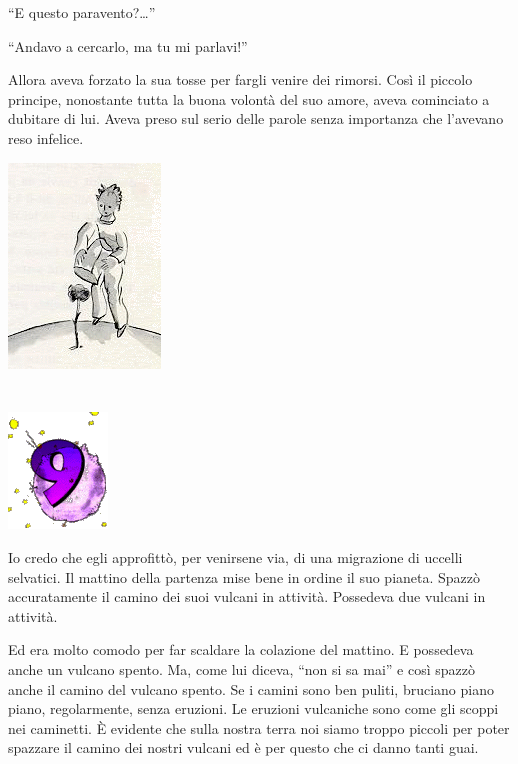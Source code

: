 \documentclass[11pt]{scrbook}
\begin{document}
``E questo paravento?\ldots{}''

``Andavo a cercarlo, ma tu mi parlavi!''

Allora aveva forzato la sua tosse per fargli venire dei rimorsi. Così il piccolo principe, nonostante tutta la buona volontà del suo amore, aveva cominciato a dubitare di lui. Aveva preso sul serio delle parole senza importanza che l'avevano reso infelice.

\begin{center}
\includegraphics{img/princKvetina}
\end{center}

\chapter{}
\begin{center}
\includegraphics{img/chapter9}
\end{center}

Io credo che egli approfittò, per venirsene via, di una migrazione di uccelli selvatici. Il mattino della partenza mise bene in ordine il suo pianeta. Spazzò accuratamente il camino dei suoi vulcani in attività. Possedeva due vulcani in attività.

Ed era molto comodo per far scaldare la colazione del mattino. E possedeva anche un vulcano spento. Ma, come lui diceva, ``non si sa mai'' e così spazzò anche il camino del vulcano spento. Se i camini sono ben puliti, bruciano piano piano, regolarmente, senza eruzioni. Le eruzioni vulcaniche sono come gli scoppi nei caminetti. È evidente che sulla nostra terra noi siamo troppo piccoli per poter spazzare il camino dei nostri vulcani ed è per questo che ci danno tanti guai.
\end{document}
